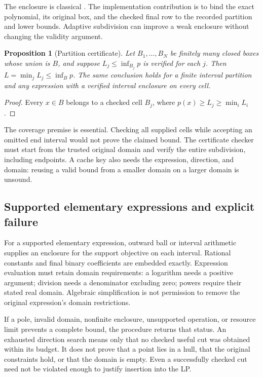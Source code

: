 \documentclass[11pt]{article}
\newtheorem{proposition}[theorem]{Proposition}
\theoremstyle{definition}
\theoremstyle{remark}
\begin{document}
The enclosure is classical
\cite{GarloffSmith2008,GarloffJanssonSmith2003}. The implementation contribution is to bind
the exact polynomial, its original box, and the checked final row to
the recorded partition and lower bounds. Adaptive subdivision can
improve a weak enclosure without changing the validity argument.

\begin{proposition}[Partition certificate]\label{prop:partition}
Let $B_1,\ldots,B_N$ be finitely many closed boxes whose union is $B$,
and suppose $L_j\le\inf_{B_j}p$ is verified for each $j$. Then
$L=\min_jL_j\le\inf_Bp$. The same conclusion holds for a finite interval
partition and any expression with a verified interval enclosure on every
cell.
\end{proposition}
\begin{proof}
Every $x\in B$ belongs to a checked cell $B_j$, where
$p(x)\ge L_j\ge\min_iL_i$.
\end{proof}

The coverage premise is essential. Checking all supplied cells while
accepting an omitted end interval would not prove the claimed bound.
The certificate checker must start from the trusted original domain and
verify the entire subdivision, including endpoints. A cache key also
needs the expression, direction, and domain: reusing a valid bound from a
smaller domain on a larger domain is unsound.

\subsection{Supported elementary expressions and explicit failure}

For a supported elementary expression, outward ball or interval
arithmetic supplies an enclosure for the support objective on each
interval. Rational constants and final binary coefficients are embedded
exactly. Expression evaluation must retain domain requirements: a
logarithm needs a positive argument; division needs a denominator
excluding zero; powers require their stated real domain. Algebraic
simplification is not permission to remove the original expression's
domain restrictions.

If a pole, invalid domain, nonfinite enclosure, unsupported operation, or
resource limit prevents a complete bound, the procedure returns that
status. An exhausted direction search means only that no checked useful
cut was obtained within its budget. It does not prove that a point lies
in a hull, that the original constraints hold, or that the domain is
empty. Even a successfully checked cut need not be violated enough to
justify insertion into the LP.
\end{document}
